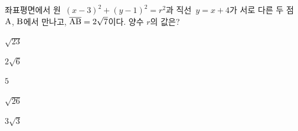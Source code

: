 좌표평면에서 원~$(x-3)^2+(y-1)^2=r^2$과 직선~$y=x+4$가 서로 다른 두 점~$\mathrm{A}$, $\mathrm{B}$에서 만나고, $\overline{\mathrm{AB}}=2\sqrt{7}$이다. 양수 $r$의 값은?
\begin{choices32}{\rule[-3ex]{0pt}{8ex}$\sqrt{23}$}{\rule[-3ex]{0pt}{8ex}$2\sqrt{6}$}{\rule[-3ex]{0pt}{8ex}$5$}{\rule[-3ex]{0pt}{8ex}$\sqrt{26}$}{\rule[-3ex]{0pt}{8ex}$3\sqrt{3}$}\end{choices32}
